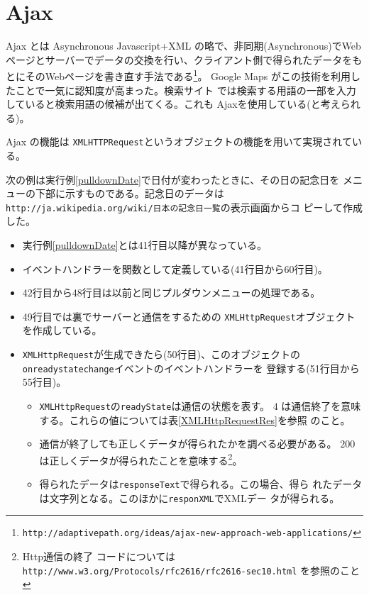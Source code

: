 \section{Ajax}
Ajax とは Asynchronous Javascript+XML の略で、非同期(Asynchronous)でWeb
ページとサーバーでデータの交換を行い、クライアント側で得られたデータをも
とにそのWebページを書き直す手法である\footnote{%
\texttt{http://adaptivepath.org/ideas/ajax-new-approach-web-applications/}}。
Google Maps がこの技術を利用したことで一気に認知度が高まった。検索サイト
では検索する用語の一部を入力していると検索用語の候補が出てくる。これも
Ajaxを使用している(と考えられる)。

Ajax の機能は \texttt{XMLHTTPRequest}というオブジェクトの機能を用いて実現されている。
\begin{Exec}\upshape\label{WhatDay}
次の例は実行例\ref{pulldownDate}で日付が変わったときに、その日の記念日を
 メニューの下部に示すものである。記念日のデータは
 \texttt{http://ja.wikipedia.org/wiki/日本の記念日一覧}の表示画面からコ
 ピーして作成した。
\begin{itemize}
 \item 実行例\ref{pulldownDate}とは41行目以降が異なっている。
 \item イベントハンドラーを関数として定義している(41行目から60行目)。
 \item 42行目から48行目は以前と同じプルダウンメニューの処理である。
 \item 49行目では裏でサーバーと通信をするための
       \texttt{XMLHttpRequest}オブジェクトを作成している。
 \item \texttt{XMLHttpRequest}が生成できたら(50行目)、このオブジェクトの
       \texttt{onreadystatechange}イベントのイベントハンドラーを
       登録する(51行目から55行目)。
 \begin{itemize}
  \item \texttt{XMLHttpRequest}の\texttt{readyState}は通信の状態を表す。
	$4$ は通信終了を意味する。これらの値については表\ref{XMLHttpRequestRes}を参照
				のこと。
  \item 通信が終了しても正しくデータが得られたかを調べる必要がある。
	$200$ は正しくデータが得られたことを意味する\footnote{Http通信の終了
				コードについては
				\texttt{http://www.w3.org/Protocols/rfc2616/rfc2616-sec10.html}
				を参照のこと}。
  \item 得られたデータは\texttt{responseText}で得られる。この場合、得ら
	れたデータは文字列となる。このほかに\texttt{responXML}でXMLデー
	タが得られる。
 \end{itemize}

\end{itemize}
\end{Exec}
